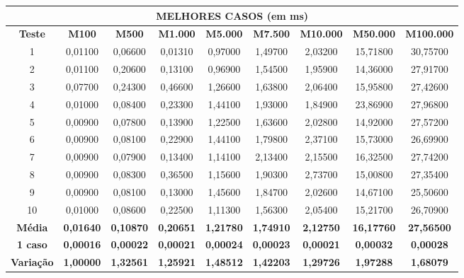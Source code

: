 \documentclass[a4paper, 12pt]{article}
\begin{document}
\vspace{0.3cm}
\begin{tabular}{ccccccccc}

                                                                 \multicolumn{ 9}{c}{{\bf MELHORES CASOS (em ms)}} \\
\hline
{\bf Teste} & {\bf M100} & {\bf M500} & {\bf M1.000} & {\bf M5.000} & {\bf M7.500} & {\bf M10.000} & {\bf M50.000} & {\bf M100.000} \\
\hline
         1 &    0,01100 &    0,06600 &    0,01310 &    0,97000 &    1,49700 &    2,03200 &   15,71800 &   30,75700 \\
\hline
         2 &    0,01100 &    0,20600 &    0,13100 &    0,96900 &    1,54500 &    1,95900 &   14,36000 &   27,91700 \\
\hline
         3 &    0,07700 &    0,24300 &    0,46600 &    1,26600 &    1,63800 &    2,06400 &   15,95800 &   27,42600 \\
\hline
         4 &    0,01000 &    0,08400 &    0,23300 &    1,44100 &    1,93000 &    1,84900 &   23,86900 &   27,96800 \\
\hline
         5 &    0,00900 &    0,07800 &    0,13900 &    1,22500 &    1,63600 &    2,02800 &   14,92000 &   27,57200 \\
\hline
         6 &    0,00900 &    0,08100 &    0,22900 &    1,44100 &    1,79800 &    2,37100 &   15,73000 &   26,69900 \\
\hline
         7 &    0,00900 &    0,07900 &    0,13400 &    1,14100 &    2,13400 &    2,15500 &   16,32500 &   27,74200 \\
\hline
         8 &    0,00900 &    0,08300 &    0,36500 &    1,15600 &    1,90300 &    2,73700 &   15,00800 &   27,35400 \\
\hline
         9 &    0,00900 &    0,08100 &    0,13000 &    1,45600 &    1,84700 &    2,02600 &   14,67100 &   25,50600 \\
\hline
        10 &    0,01000 &    0,08600 &    0,22500 &    1,11300 &    1,56300 &    2,05400 &   15,21700 &   26,70900 \\
\hline
{\bf Média} & {\bf 0,01640} & {\bf 0,10870} & {\bf 0,20651} & {\bf 1,21780} & {\bf 1,74910} & {\bf 2,12750} & {\bf 16,17760} & {\bf 27,56500} \\
\hline
{\bf 1 caso} & {\bf 0,00016} & {\bf 0,00022} & {\bf 0,00021} & {\bf 0,00024} & {\bf 0,00023} & {\bf 0,00021} & {\bf 0,00032} & {\bf 0,00028} \\
\hline
{\bf Variação} & {\bf 1,00000} & {\bf 1,32561} & {\bf 1,25921} & {\bf 1,48512} & {\bf 1,42203} & {\bf 1,29726} & {\bf 1,97288} & {\bf 1,68079} \\
\hline
\end{tabular}  
\vspace{0.3cm}
\end{document}
